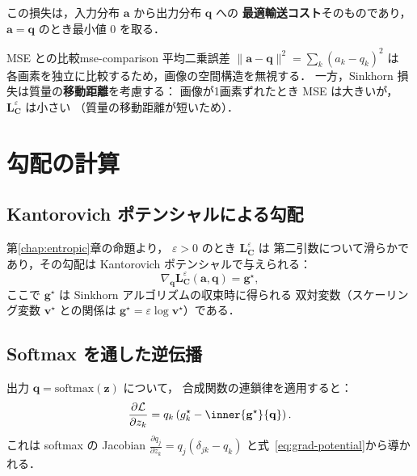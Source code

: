 この損失は，入力分布 $\mathbf{a}$ から出力分布 $\mathbf{q}$ への
\textbf{最適輸送コスト}そのものであり，
$\mathbf{a} = \mathbf{q}$ のとき最小値 $0$ を取る．

\begin{remark}{MSE との比較}{mse-comparison}
平均二乗誤差 $\|\mathbf{a} - \mathbf{q}\|^2 = \sum_k (a_k - q_k)^2$ は
各画素を独立に比較するため，画像の空間構造を無視する．
一方，Sinkhorn 損失は質量の\textbf{移動距離}を考慮する：
画像が1画素ずれたとき MSE は大きいが，
$\mathbf{L}^\varepsilon_{\mathbf{C}}$ は小さい
（質量の移動距離が短いため）．
\end{remark}


\section{勾配の計算}\label{sec:gradient}

\subsection{Kantorovich ポテンシャルによる勾配}

第\ref{chap:entropic}章の命題より，
$\varepsilon > 0$ のとき $\mathbf{L}^\varepsilon_{\mathbf{C}}$ は
第二引数について滑らかであり，その勾配は
Kantorovich ポテンシャルで与えられる：
\begin{equation}\label{eq:grad-potential}
  \nabla_{\mathbf{q}} \mathbf{L}^\varepsilon_{\mathbf{C}}(\mathbf{a}, \mathbf{q})
  = \mathbf{g}^\star,
\end{equation}
ここで $\mathbf{g}^\star$ は Sinkhorn アルゴリズムの収束時に得られる
双対変数（スケーリング変数 $\mathbf{v}^\star$ との関係は
$\mathbf{g}^\star = \varepsilon \log \mathbf{v}^\star$）である．

\subsection{Softmax を通した逆伝播}

出力 $\mathbf{q} = \mathrm{softmax}(\mathbf{z})$ について，
合成関数の連鎖律を適用すると：
\begin{equation}\label{eq:softmax-grad}
  \frac{\partial \mathcal{L}}{\partial z_k}
  = q_k \left( g^\star_k - \inner{\mathbf{g}^\star}{\mathbf{q}} \right).
\end{equation}
これは softmax の Jacobian
$\frac{\partial q_j}{\partial z_k} = q_j(\delta_{jk} - q_k)$
と式~\eqref{eq:grad-potential}から導かれる．

